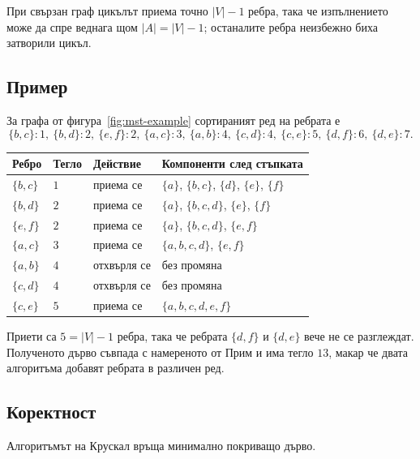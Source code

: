 При свързан граф цикълът приема точно $|V|-1$ ребра, така че изпълнението може да спре веднага щом $|A|=|V|-1$; останалите ребра неизбежно биха затворили цикъл.

\subsection{Пример}\label{s:7.4.3}

\begin{example}
За графа от фигура~\ref{fig:mst-example} сортираният ред на ребрата е
\[
\{b,c\}{:}1,\ \{b,d\}{:}2,\ \{e,f\}{:}2,\ \{a,c\}{:}3,\ \{a,b\}{:}4,\ \{c,d\}{:}4,\ \{c,e\}{:}5,\ \{d,f\}{:}6,\ \{d,e\}{:}7.
\]

\begin{center}
\begin{tabular}{llll}
\toprule
Ребро & Тегло & Действие & Компоненти след стъпката \\
\midrule
$\{b,c\}$ & $1$ & приема се & $\{a\}$, $\{b,c\}$, $\{d\}$, $\{e\}$, $\{f\}$ \\
$\{b,d\}$ & $2$ & приема се & $\{a\}$, $\{b,c,d\}$, $\{e\}$, $\{f\}$ \\
$\{e,f\}$ & $2$ & приема се & $\{a\}$, $\{b,c,d\}$, $\{e,f\}$ \\
$\{a,c\}$ & $3$ & приема се & $\{a,b,c,d\}$, $\{e,f\}$ \\
$\{a,b\}$ & $4$ & отхвърля се & без промяна \\
$\{c,d\}$ & $4$ & отхвърля се & без промяна \\
$\{c,e\}$ & $5$ & приема се & $\{a,b,c,d,e,f\}$ \\
\bottomrule
\end{tabular}
\end{center}

Приети са $5=|V|-1$ ребра, така че ребрата $\{d,f\}$ и $\{d,e\}$ вече не се разглеждат. Полученото дърво съвпада с намереното от Прим и има тегло $13$, макар че двата алгоритъма добавят ребрата в различен ред.
\end{example}

\subsection{Коректност}\label{s:7.4.4}

\begin{keythm}
Алгоритъмът на Крускал връща минимално покриващо дърво.
\end{keythm}

